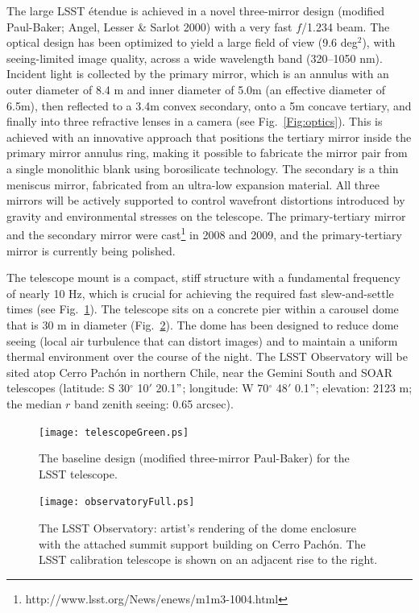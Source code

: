 \documentclass{emulateapj}
\begin{document}
The large LSST \'etendue is achieved in a novel three-mirror design (modified
Paul-Baker; Angel, Lesser \& Sarlot 2000) with a very fast $f$/1.234 beam. The optical 
design has been optimized to yield a large field of view (9.6 deg$^2$), 
with seeing-limited image quality, across a wide wavelength band (320--1050
nm). Incident light is collected by the primary mirror, which is an annulus
with an outer diameter of 8.4 m and inner diameter of 5.0m (an effective diameter of 
6.5m), then reflected to a 3.4m convex secondary, onto a 5m concave tertiary, and finally 
into three refractive lenses in a camera (see Fig.~\ref{Fig:optics}). This is achieved 
with an innovative approach that positions the tertiary mirror inside the primary 
mirror annulus ring, making it possible to fabricate the mirror pair from a 
single monolithic blank using borosilicate technology. The secondary is 
a thin meniscus mirror, fabricated from an ultra-low expansion material. All 
three mirrors will be actively supported to control wavefront distortions 
introduced by gravity and environmental stresses on the telescope. 
The primary-tertiary mirror and the secondary mirror were 
cast\footnote{http://www.lsst.org/News/enews/m1m3-1004.html}  in 2008 and 2009,
and the primary-tertiary mirror is currently being polished. 

The telescope mount is a compact, stiff structure with a fundamental frequency of 
nearly 10 Hz, which is crucial for achieving the required fast slew-and-settle times
(see Fig.~\ref{Fig:telescope}). The telescope sits on a concrete pier within a 
carousel dome that is 30 m in diameter (Fig.~\ref{Fig:observatory}). The dome has 
been designed to reduce dome seeing (local air turbulence that can distort images) 
and to maintain a uniform thermal environment over the course of the night. 
The LSST Observatory will be sited atop Cerro Pach\'{o}n in northern Chile,
near the Gemini South and SOAR telescopes (latitude: S 30$^\circ$ 10$'$ 20.1$"$; 
longitude: W 70$^\circ$ 48$'$ 0.1$"$; elevation: 2123 m; the median $r$ band
zenith seeing: 0.65 arcsec).


\begin{figure}
\vskip -0.65in
\texttt{[image: telescopeGreen.ps]}
\vskip -0.65in
\caption{The baseline design (modified three-mirror Paul-Baker) for the 
LSST telescope.} 
\label{Fig:telescope}
\end{figure}


\begin{figure}
\vskip -1.3in
\texttt{[image: observatoryFull.ps]}
\vskip -1.4in
\caption{The LSST Observatory: artist's rendering of the dome enclosure 
with the attached summit support building on Cerro Pach\'{o}n. The LSST calibration 
telescope is shown on an adjacent rise to the right.} 
\label{Fig:observatory}
\end{figure}
\end{document}
